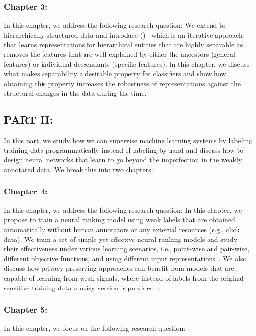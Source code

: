 \subsubsection*{Chapter 3: }
In this chapter, we address the following research question:
We extend \emph{\swlms} to hierarchically structured data and introduce \emph{\hswlms} (\achswlm)~\citep{Dehghani:2016:ICTIR, Dehghani:2016:CLEF} which is an iterative approach that learns representations for hierarchical entities that are highly separable as \acswlm removes the features that are well explained by either the ancestors (general features) or individual descendants (specific features). In this chapter, we discuss what makes separability a desirable property for classifiers and show how obtaining this property increases the robustness of representations against the structural changes in the data during the time.

\subsection*{PART II: }
In this part, we study how we can supervise machine learning systems by labeling training data programmatically instead of labeling by hand and discuss how to design neural networks that learn to go beyond the imperfection in the weakly annotated data. We break this into two chapters:

\subsubsection*{Chapter 4: }
In this chapter, we address the following research question:
In this chapter, we propose to train a neural ranking model using weak labels that are obtained automatically without human annotators or any external resources (e.g., click data). We train a set of simple yet effective neural ranking models and study their effectiveness under various learning scenarios, i.e., point-wise and pair-wise, different objective functions, and using different input representations~\citep{Dehghani:2017:SIGIR}. We also discuss how privacy preserving approaches can benefit from models that are capable of learning from weak signals, where instead of labels from the original sensitive training data a noisy version is provided~\citep{dehghani:2017:neuir}.

\subsubsection*{Chapter 5: }
In this chapter, we focus on the following research question:

